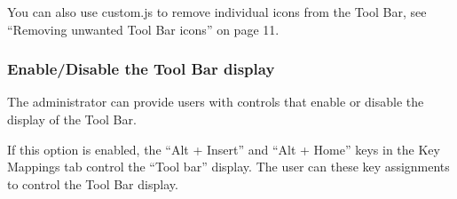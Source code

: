 \documentclass[letterpaper,10pt,english]{sphinxmanual}
\begin{document}
\begin{sphinxVerbatim}[commandchars=\\\{\}]
        
       
\end{sphinxVerbatim}


You can also use custom.js to remove individual icons from the Tool Bar, see “Removing unwanted Tool Bar icons” on page 11.

\ignorespaces 

\subsubsection{Enable/Disable the Tool Bar display}
\label{\detokenize{Customization:enable-disable-the-tool-bar-display}}\label{\detokenize{Customization:index-18}}
The administrator can provide users with controls that enable or disable the display of the Tool Bar.

\begin{sphinxVerbatim}[commandchars=\\\{\}]
             
  
\end{sphinxVerbatim}


If this option is enabled, the “Alt + Insert” and “Alt + Home” keys in the Key Mappings tab control the “Tool bar” display. The user can these key assignments to control the Tool Bar display.
\end{document}
